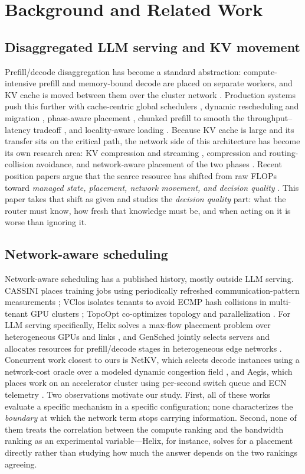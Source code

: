 \section{Background and Related Work}
\label{sec:related}

\subsection{Disaggregated LLM serving and KV movement}
Prefill/decode disaggregation has become a standard abstraction: compute-intensive prefill and
memory-bound decode are placed on separate workers, and KV cache is moved between them over the
cluster network \cite{distserve,splitwise,mooncake}. Production systems push this further with
cache-centric global schedulers \cite{mooncake}, dynamic rescheduling and migration
\cite{llumnix}, phase-aware placement \cite{splitwise}, chunked prefill to smooth the
throughput--latency tradeoff \cite{sarathi}, and locality-aware loading \cite{serverlessllm}.
Because KV cache is large and its transfer sits on the critical path, the network side of this
architecture has become its own research area: KV compression and streaming \cite{cachegen},
compression and routing-collision avoidance, and network-aware placement of the two phases
\cite{helix,flowkv}. Recent position papers argue that the scarce resource has shifted from raw
FLOPs toward \emph{managed state, placement, network movement, and decision quality}
\cite{cloudabstractions,controlplane}. This paper takes that shift as given and studies the
\emph{decision quality} part: what the router must know, how fresh that knowledge must be, and
when acting on it is worse than ignoring it.

\subsection{Network-aware scheduling}
Network-aware scheduling has a published history, mostly outside LLM serving. CASSINI places
training jobs using periodically refreshed communication-pattern measurements \cite{cassini};
VClos isolates tenants to avoid ECMP hash collisions in multi-tenant GPU clusters \cite{vclos};
TopoOpt co-optimizes topology and parallelization \cite{topoopt}. For LLM serving specifically,
Helix solves a max-flow placement problem over heterogeneous GPUs and links \cite{helix}, and
GenSched jointly selects servers and allocates resources for prefill/decode stages in
heterogeneous edge networks \cite{gensched}. Concurrent work closest to ours is NetKV, which
selects decode instances using a network-cost oracle over a modeled dynamic congestion field
\cite{netkv}, and Aegis, which places work on an accelerator cluster using per-second switch
queue and ECN telemetry \cite{aegis}. Two observations motivate our study. First, all of these
works evaluate a specific mechanism in a specific configuration; none characterizes the
\emph{boundary} at which the network term stops carrying information. Second, none of them treats
the correlation between the compute ranking and the bandwidth ranking as an experimental
variable---Helix, for instance, solves for a placement directly rather than studying how much the
answer depends on the two rankings agreeing.

